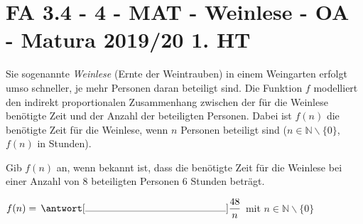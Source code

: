 \section{FA 3.4 - 4 - MAT - Weinlese - OA - Matura 2019/20 1. HT}

\begin{beispiel}[FA 3.4]{1}
Sie sogenannte \textit{Weinlese} (Ernte der Weintrauben) in einem Weingarten erfolgt umso schneller, je mehr Personen daran beteiligt sind. Die Funktion $f$ modelliert den indirekt proportionalen Zusammenhang zwischen der für die Weinlese benötigte Zeit und der Anzahl der beteiligten Personen. Dabei ist $f(n)$ die benötigte Zeit für die Weinlese, wenn $n$ Personen beteiligt sind ($n\in\mathbb{N}\backslash\{0\}$, $f(n)$ in Stunden).

Gib $f(n)$ an, wenn bekannt ist, dass die benötigte Zeit für die Weinlese bei einer Anzahl von 8 beteiligten Personen 6 Stunden beträgt.\leer

$f(n)=\,\antwort[\rule{5cm}{0.3pt}]{\dfrac{48}{n}}$ mit $n\in\mathbb{N}\backslash\{0\}$
\end{beispiel}